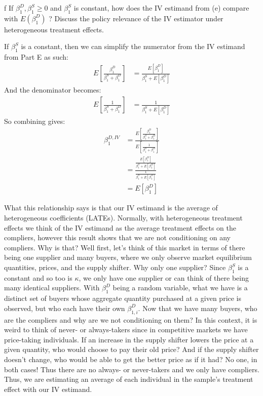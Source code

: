 \documentclass{article}
\begin{document}
\begin{problem}{f}
If $\beta_{1}^{D}, \beta_{1}^{S} \geq 0$ and $\beta_{1}^{S}$ is constant, how does the IV estimand from (e) compare with $E\left(\beta_{1}^{D}\right)$ ? Discuss the policy relevance of the IV estimator under heterogeneous treatment effects.
\end{problem}
\begin{solution}
If $\beta_1^S$ is a constant, then we can simplify the numerator from the IV estimand from Part E as such:
\begin{align*}
    E\left [ \frac{\beta_1^D}{\beta_1^S+\beta_1^D} \right] &=  \frac{E[\beta_1^D]}{\beta_1^S+E[\beta_1^D]}
\end{align*}
And the denominator becomes:
\begin{align*}
    E\left[ \frac{1}{\beta_1^S+\beta_1^D}\right] &=  \frac{1}{\beta_1^S+E[\beta_1^D]}
\end{align*}
So combining gives:
\begin{align*}
    \beta_1^{D,IV} &= \frac{E\left [ \frac{\beta_1^D}{\beta_1^S+\beta_1^D} \right]}{E\left[ \frac{1}{\beta_1^S+\beta_1^D}\right]} \tag{Part E answer} \\
    &=\frac{\frac{E[\beta_1^D]}{\beta_1^S+E[\beta_1^D]}}{\frac{1}{\beta_1^S+E[\beta_1^D]}} \\
    &= E[\beta_1^D]
\end{align*}
\end{solution}
What this relationship says is that our IV estimand is the average of heterogeneous coefficients (LATEs). Normally, with heterogeneous treatment effects we think of the IV estimand as the average treatment effects on the compliers, however this result shows that we are not conditioning on any compliers. Why is that? Well first, let's think of this market in terms of there being one supplier and many buyers, where we only observe market equilibrium quantities, prices, and the supply shifter. Why only one supplier? Since $\beta_1^S$ is a constant and so too is $\kappa$, we only have one supplier or can think of there being many identical suppliers. With $\beta_1^D$ being a random variable, what we have is a distinct set of buyers whose aggregate quantity purchased at a given price is observed, but who each have their own $\beta_{1,i}^D$. Now that we have many buyers, who are the compliers and why are we not conditioning on them? In this context, it is weird to think of never- or always-takers since in competitive markets we have price-taking individuals. If an increase in the supply shifter lowers the price at a given quantity, who would choose to pay their old price? And if the supply shifter doesn't change, who would be able to get the better price as if it had? No one, in both cases! Thus there are no always- or never-takers and we only have compliers. Thus, we are estimating an average of each individual in the sample's treatment effect with our IV estimand.
\end{document}
